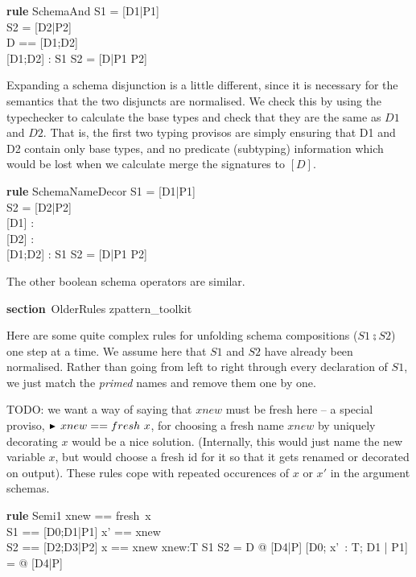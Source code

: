 \documentclass{article}
\newenvironment{zsection}{\begin{zed}}{\end{zed}}
\newcommand{\SECTION}{\textbf{section}~}
\newcommand{\parents}{\mathrel{\textbf{parents}}}
\newenvironment{zedrule}[1]{\par\textbf{rule }#1\vspace{-2ex}\infrule}{\endinfrule}
\newcommand{\derives}{\derive{}}
\newcommand{\substitute}{\mathrel{\curvearrowleft}}  %
\newcommand{\proviso}{\raisebox{0.5ex}{${}_{\blacktriangleright}\ $}}%
\begin{document}
\begin{zedrule}{SchemaAnd}
  S1 = [D1|P1] \\
  S2 = [D2|P2] \\
  \proviso D == [D1;D2] \\
  \proviso [D1;D2] : \power [D]
\derives
  S1 \land S2 = [D|P1 \land P2]
\end{zedrule}


Expanding a schema disjunction is a little different,
since it is necessary for the semantics that the two
disjuncts are normalised.  We check this by using
the typechecker to calculate the base types and check
that they are the same as $D1$ and $D2$.  That is,
the first two typing provisos are simply ensuring
that D1 and D2 contain only base types, and no predicate
(subtyping) information which would be lost when
we calculate merge the signatures to $[D]$.

\begin{zedrule}{SchemaNameDecor}
  S1 = [D1|P1] \\
  S2 = [D2|P2] \\
  \proviso [D1] : \power [D1] \\
  \proviso [D2] : \power [D2] \\
  \proviso [D1;D2] : \power [D]
\derives
  S1 \lor S2 = [D|P1 \lor P2]
\end{zedrule}

The other boolean schema operators are similar.

\begin{zsection}
  \SECTION OlderRules \parents zpattern\_toolkit
\end{zsection}

Here are some quite complex rules for unfolding schema compositions
($S1 \semi S2$) one step at a time.  We assume here that $S1$
and $S2$ have already been normalised.  Rather than going from
left to right through every declaration of $S1$, we just match
the \emph{primed} names and remove them one by one.

TODO: we want a way of saying that $xnew$ must be fresh here
-- a special proviso, $\proviso xnew == fresh~x$, for choosing a
fresh name $xnew$ by uniquely decorating $x$ would be a nice solution.
(Internally, this would just name the new variable $x$, but would 
choose a fresh id for it so that it gets renamed or decorated on output).
These rules cope with repeated occurences of $x$ or $x'$
in the argument schemas.

\begin{zedrule}{Semi1}
  \proviso xnew == fresh~x \\
  \proviso S1 == [D0;D1|P1] \substitute \lblot x' == xnew \rblot \\
  \proviso S2 == [D2;D3|P2] \substitute \lblot x == xnew \rblot
  xnew:T \vdash S1 \semi S2 = \exists D @ [D4|P]
\derives
  [D0; x'~: T; D1 | P1] \semi [D2; x:T; D3 | P2]\\
      = \exists [xnew:T; D] @ [D4|P]
\end{zedrule}
\end{document}
